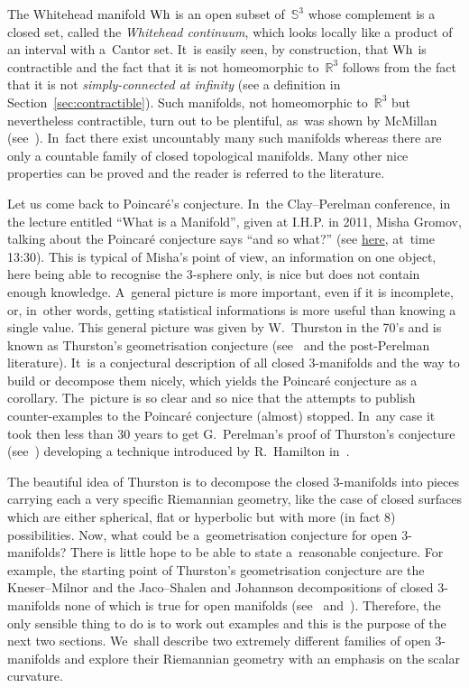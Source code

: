 \documentclass[pdftex]{sigma}
\numberwithin{equation}{section}
\begin{document}
The Whitehead manifold $\rm Wh$ is an open subset of~$\mathbb{S}^3$ whose complement is a closed set, called the \textit{Whitehead continuum}, which looks locally like a product of an interval with a~Cantor
set. It~is easily seen, by construction, that $\rm Wh$ is contractible and the fact that it is not home\-o\-mor\-phic to~$\mathbb{R}^3$ follows from the fact that it is not \textit{simply-connected at infinity} (see a definition in Section~\ref{sec:contractible}). Such manifolds, not homeomorphic to~$\mathbb{R}^3$ but nevertheless contractible, turn out to be plentiful, as~was shown by McMillan (see~\cite{McMil}). In~fact there exist uncountably many such manifolds whereas there are only a countable family of closed topological manifolds. Many other nice properties can be proved and the reader is referred to the literature.

Let us come back to Poincar\'e's conjecture. In~the Clay--Perelman conference, in the lecture entitled ``What is a Manifold'', given at I.H.P. in 2011, Misha Gromov, talking about the Poincar\'e conjecture says ``and so what?'' (see \href{https://www.youtube.com/watch?v=u5DLpAqX4YA}{here}, at~time 13:30). This is typical of Misha's point of view, an information on one object, here being able to recognise the $3$-sphere only, is nice but does not contain enough knowledge. A~general picture is
more important, even if it is incomplete, or, in~other words, getting statistical informations is more useful than knowing a single value. This general picture was given by W.~Thurston in the 70's and is known as Thurston's geometrisation conjecture (see~\cite{Thur} and the post-Perelman literature). It~is a conjectural description of all closed $3$-manifolds and
the way to build or decompose them nicely, which yields the Poincar\'e
conjecture as a corollary. The~picture is so clear and so nice that the attempts to publish counter-examples to the Poincar\'e conjecture (almost) stopped. In~any case it took then less than 30 years to get G.~Perelman's proof of Thurston's conjecture (see~\cite{Per1, Per2, Per3}) developing a technique introduced by R.~Hamilton in~\cite{Ham}.

The beautiful idea of Thurston is to decompose the closed $3$-manifolds into pieces carrying each a very specific Riemannian geometry, like the case of closed surfaces which are either spherical, flat or hyperbolic but with more (in fact 8) possibilities. Now, what could be a~geometrisation conjecture for open $3$-manifolds? There is little hope to be able to state a~reasonable conjecture. For example, the starting point of Thurston's geometrisation conjecture are the Kneser--Milnor and the Jaco--Shalen and Johannson decompositions of closed $3$-manifolds none of which is true for open manifolds (see~\cite{S-T} and~\cite{Mai}). Therefore, the only sensible thing to do is to work out examples and this is the purpose of the next two sections. We~shall describe two extremely different families of open $3$-manifolds and explore their Riemannian geometry with an emphasis on
the scalar curvature.
\end{document}
